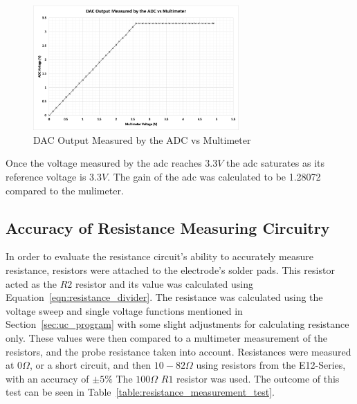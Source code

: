 \begin{figure}[H]\label{fig:adc_test}
    \centering
    \includegraphics[width=0.7\textwidth]{figures/adc_test.png}
    \caption{DAC Output Measured by the ADC vs Multimeter}
    \label{fig:adc_test}
\end{figure}

Once the voltage measured by the \gls{adc} reaches $3.3V$ the \gls{adc} saturates as its reference voltage is $3.3V$.
The gain of the \gls{adc} was calculated to be 1.28072 compared to the mulimeter.

\subsection{Accuracy of Resistance Measuring Circuitry}\label{sec:resistor_measuring_test}
In order to evaluate the resistance circuit's ability to accurately measure resistance, resistors were attached to the electrode's solder pads.
This resistor acted as the $R2$ resistor and its value was calculated using Equation~\ref{eqn:resistance_divider}.
The resistance was calculated using the voltage sweep and single voltage functions mentioned in Section~\ref{sec:uc_program} with some slight adjustments for calculating resistance only.
These values were then compared to a multimeter measurement of the resistors, and the probe resistance taken into account.
Resistances were measured at $0\Omega$, or a short circuit, and then $10-82\Omega$ using resistors from the E12-Series, with an accuracy of $\pm5\%$
The $100\Omega$ $R1$ resistor was used.
The outcome of this test can be seen in Table~\ref{table:resistance_measurement_test}.

